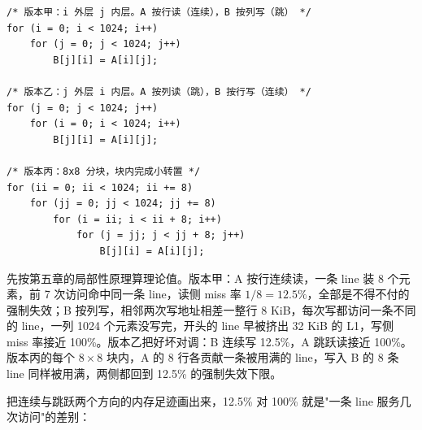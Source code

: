 \begin{lstlisting}
/* 版本甲：i 外层 j 内层。A 按行读（连续），B 按列写（跳） */
for (i = 0; i < 1024; i++)
    for (j = 0; j < 1024; j++)
        B[j][i] = A[i][j];

/* 版本乙：j 外层 i 内层。A 按列读（跳），B 按行写（连续） */
for (j = 0; j < 1024; j++)
    for (i = 0; i < 1024; i++)
        B[j][i] = A[i][j];

/* 版本丙：8x8 分块，块内完成小转置 */
for (ii = 0; ii < 1024; ii += 8)
    for (jj = 0; jj < 1024; jj += 8)
        for (i = ii; i < ii + 8; i++)
            for (j = jj; j < jj + 8; j++)
                B[j][i] = A[i][j];
\end{lstlisting}

先按第五章的局部性原理算理论值。版本甲：A 按行连续读，一条 line 装 8 个元素，前 7 次访问命中同一条 line，读侧 miss 率 $1/8=12.5\%$，全部是不得不付的强制失效；B 按列写，相邻两次写地址相差一整行 8 KiB，每次写都访问一条不同的 line，一列 1024 个元素没写完，开头的 line 早被挤出 32 KiB 的 L1，写侧 miss 率接近 100\%。版本乙把好坏对调：B 连续写 12.5\%，A 跳跃读接近 100\%。版本丙的每个 $8\times8$ 块内，A 的 8 行各贡献一条被用满的 line，写入 B 的 8 条 line 同样被用满，两侧都回到 12.5\% 的强制失效下限。

把连续与跳跃两个方向的内存足迹画出来，12.5\% 对 100\% 就是"一条 line 服务几次访问"的差别：

